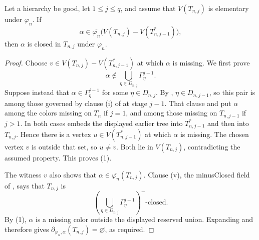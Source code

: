 \begin{lemma}
Let a hierarchy be good, let $1\leq j\leq q$, and assume that
$V(T_{n,j})$ is elementary under $\varphi_n$.  If
\[
 \alpha\in
 \overline{\varphi_n}\bigl(
   V(T_{n,j})-V(T_{n,j-1}^{*})\bigr),
\]
then $\alpha$ is closed in $T_{n,j}$ under $\varphi_n$.
\end{lemma}
\begin{proof}
Choose
$v\in V(T_{n,j})-V(T_{n,j-1}^{*})$ at which $\alpha$ is missing.
We first prove
\[
 \alpha\notin
 \bigcup_{\eta\in D_{n,j}}\Gamma^{j-1}_\eta.                  \tag{1}
\]
Suppose instead that $\alpha\in\Gamma^{j-1}_\eta$ for some
$\eta\in D_{n,j}$.  By
, $\eta\in D_{n,j-1}$, so this
pair is among those governed by clause (i) of
 at stage $j-1$.  That clause and
 put $\alpha$ among the colors
missing on $T_n$ if $j=1$, and among those missing on $T_{n,j-1}$ if
$j>1$.  In both cases
 embeds the displayed earlier tree into
$T_{n,j-1}^{*}$ and then into $T_{n,j}$.  Hence there is a vertex
$u\in V(T_{n,j-1}^{*})$ at which $\alpha$ is missing.  The chosen
vertex $v$ is outside that set, so $u\ne v$.  Both lie in
$V(T_{n,j})$, contradicting the assumed
 property.  This proves (1).

The witness $v$ also shows that
$\alpha\in\overline{\varphi_n}(T_{n,j})$.  Clause (v), the
minusClosed field of , says that $T_{n,j}$ is
\[
 \left(\bigcup_{\eta\in D_{n,j}}
        \Gamma^{j-1}_\eta\right)^{-}\text{-closed}.
\]
By (1), $\alpha$ is a missing color outside the displayed reserved
union.  Expanding  and
 therefore gives
$\partial_{\varphi_n,\alpha}(T_{n,j})=\varnothing$, as required.
\end{proof}
